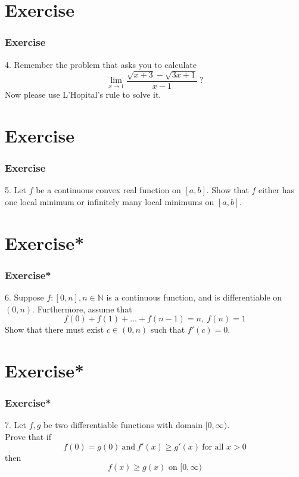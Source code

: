 \documentclass[12pt, t]{beamer}
\begin{document}
\section{Exercise}
\begin{frame}
    \frametitle{Exercise}
4. Remember the problem that asks you to calculate
\begin{equation*}
    \underset{x\rightarrow 1}{\lim}\frac{\sqrt{x+3}-\sqrt{3x+1}}{x-1}\ ?
\end{equation*} 
Now please use L'Hopital's rule to solve it. 
\end{frame}

\section{Exercise}
\begin{frame}
    \frametitle{Exercise}
5. Let $f$ be a continuous convex real function on $[a,b]$. Show that $f$ either has one local minimum or infinitely many local minimums on $[a,b]$.
\end{frame}


\section{Exercise*}
\begin{frame}
    \frametitle{Exercise*}
6. Suppose $f:[0,n],n\in \mathbb{N}$ is a continuous function, and is differentiable on $(0,n)$. Furthermore, assume that 
\begin{equation*}
    f(0)+f(1)+\dots+f(n-1)=n,\ f(n)=1
\end{equation*} 
Show that there must exist $c\in (0,n)$ such that $f'(c)=0$.

\end{frame}


\section{Exercise*}
\begin{frame}
    \frametitle{Exercise*}
7. Let $f,g$ be two differentiable functions with domain $[0,\infty)$.\\
Prove that if
\begin{equation*}
    f(0)=g(0)\ \text{and} \ f'(x)\geq g'(x)\ \text{for all }x>0
\end{equation*}
then 
\begin{equation*}
    f(x)\geq g(x) \text{ on } [0,\infty)
\end{equation*}
\end{frame}
\end{document}
